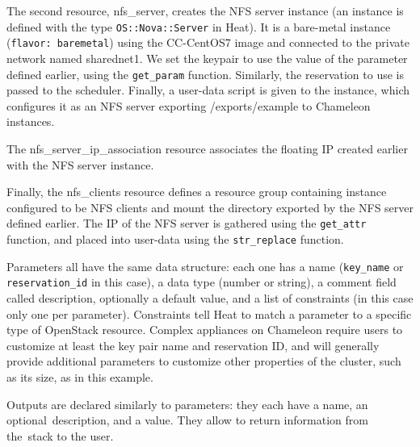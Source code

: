 The second resource, nfs\_server, creates the NFS server instance (an
instance is defined with the type \texttt{OS::Nova::Server} in Heat). It
is a bare-metal instance (\texttt{flavor:\ baremetal}) using the
CC-CentOS7 image and connected to the private network named sharednet1.
We set the keypair to use the value of the parameter defined earlier,
using the \texttt{get\_param} function. Similarly, the reservation to
use is passed to the scheduler. Finally, a user-data script is given to
the instance, which configures it as an NFS server exporting
/exports/example to Chameleon instances.

The nfs\_server\_ip\_association resource associates the floating IP
created earlier with the NFS server instance.

Finally, the nfs\_clients resource defines a resource group containing
instance configured to be NFS clients and mount the directory exported
by the NFS server defined earlier. The IP of the NFS server is gathered
using the \texttt{get\_attr} function, and placed into user-data using
the \texttt{str\_replace} function.

Parameters all have the same data structure: each one has a name
(\texttt{key\_name} or \texttt{reservation\_id} in this case), a data
type (number or string), a comment field called description, optionally
a default value, and a list of constraints (in this case only one per
parameter). Constraints tell Heat to match a parameter to a specific
type of OpenStack resource. Complex appliances on Chameleon require
users to customize at least the key pair name and reservation ID, and
will generally provide additional parameters to customize other
properties of the cluster, such as its size, as in this example.

Outputs are declared similarly to parameters: they each have a name, an
optional~description, and a value. They allow to return information from
the~stack to the user.

